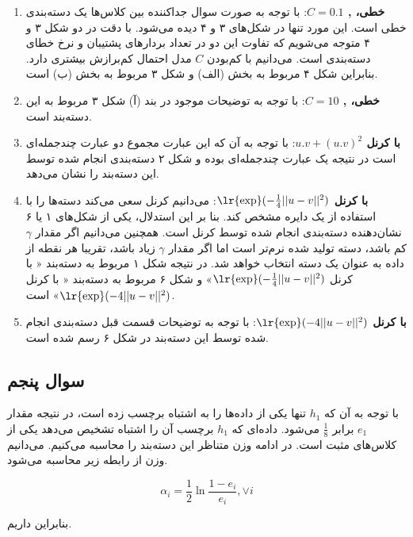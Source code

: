 \documentclass{article}
\begin{document}
\begin{enumerate}[label=\alph*)]
    \item \textbf{ خطی، , $C=0.1$}: با توجه به صورت سوال جداکننده بین کلاس‌ها یک
    دسته‌بندی خطی است. این مورد تنها در شکل‌های ۳ و ۴ دیده می‌شود. با دقت در دو شکل ۳ و ۴ متوجه می‌شویم که
    تفاوت این دو در تعداد بردار‌های پشتیبان و نرخ خطای دسته‌بندی است. می‌دانیم با کم‌بودن $C$ مدل احتمال کم‌برازش بیشتری
    دارد. بنابراین شکل ۴ مربوط به بخش (الف) و شکل ۳ مربوط به بخش (ب) است.
    \item \textbf{ خطی، , $C=10$}: با توجه به توضیحات موجود در بند (آ) شکل ۳ مربوط به این
    دسته‌بند است.
    \item \textbf{ با کرنل $u.v + (u.v)^2$}: با توجه به آن که این عبارت مجموع دو عبارت
    چند‌جمله‌ای است در نتیجه یک عبارت چندجمله‌ای بوده و شکل ۲ دسته‌بندی انجام شده توسط این دسته‌بند را نشان می‌دهد.
    \item \textbf{ با کرنل $\text{\lr{exp}}(-\frac{1}{4}||u-v||^2)$}: می‌دانیم
    کرنل  سعی می‌کند دسته‌ها را با استفاده از یک دایره مشخص کند. بنا بر این استدلال، یکی از شکل‌های
    ۱ یا ۶ نشان‌دهنده دسته‌بندی انجام شده توسط کرنل  است. همچنین می‌دانیم اگر مقدار $\gamma$ کم باشد،
    دسته تولید شده نرم‌تر است اما اگر مقدار $\gamma$ زیاد باشد، تقریبا هر نقطه از داده به عنوان یک دسته انتخاب
    خواهد شد. در نتیجه شکل ۱ مربوط به دسته‌بند « با کرنل $\text{\lr{exp}}(-\frac{1}{4}||u-v||^2)$»
    و شکل ۶ مربوط به دسته‌بند « با کرنل $\text{\lr{exp}}(-4||u-v||^2)$» است.
    \item \textbf{ با کرنل $\text{\lr{exp}}(-4||u-v||^2)$}: با توجه به توضیحات قسمت قبل
    دسته‌بندی انجام شده توسط این دسته‌بند در شکل ۶ رسم شده است.
\end{enumerate}

\subsection*{سوال پنجم}

با توجه به آن که $h_1$ تنها یکی از داده‌ها را به اشتباه برچسب زده است، در نتیجه مقدار $e_1$ برابر $\frac{1}{8}$
می‌شود. داده‌ای که $h_1$ برچسب آن را اشتباه تشخیص می‌دهد یکی از کلاس‌های مثبت است. در ادامه وزن متناظر این دسته‌بند را محاسبه
می‌کنیم. می‌دانیم وزن از رابطه زیر محاسبه می‌شود.

$$\alpha_i = \frac{1}{2} \ln\frac{1-e_i}{e_i}, \vee i$$

بنابراین داریم.
\end{document}
